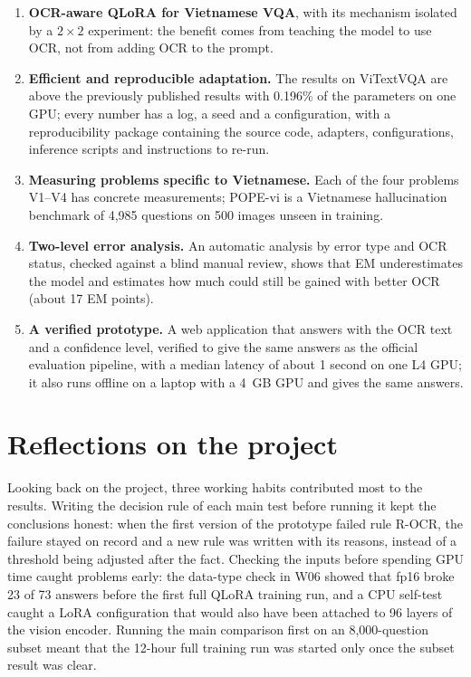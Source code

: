 \begin{enumerate}
  \item \textbf{OCR-aware QLoRA for Vietnamese VQA}, with its mechanism isolated by a
  $2\times2$ experiment: the benefit comes from teaching the model to use OCR, not from adding
  OCR to the prompt.
  \item \textbf{Efficient and reproducible adaptation.} The results on ViTextVQA are above the
  previously published results with 0.196\% of the parameters on one GPU; every number has a
  log, a seed and a configuration, with a reproducibility package containing the source code,
  adapters, configurations, inference scripts and instructions to re-run.
  \item \textbf{Measuring problems specific to Vietnamese.} Each of the four problems V1--V4
  has concrete measurements; POPE-vi is a Vietnamese hallucination benchmark of 4,985
  questions on 500 images unseen in training.
  \item \textbf{Two-level error analysis.} An automatic analysis by error type and OCR status,
  checked against a blind manual review, shows that EM underestimates the model and estimates
  how much could still be gained with better OCR (about 17 EM points).
  \item \textbf{A verified prototype.} A web application that answers with the OCR text and a
  confidence level, verified to give the same answers as the official evaluation pipeline,
  with a median latency of about 1 second on one L4 GPU; it also runs offline on a laptop
with a 4~GB GPU and gives the same answers.
\end{enumerate}

\section{Reflections on the project}
\label{sec:con-reflect}

Looking back on the project, three working habits contributed most to the results. Writing
the decision rule of each main test before running it kept the conclusions honest: when the
first version of the prototype failed rule R-OCR, the failure stayed on record and a new rule
was written with its reasons, instead of a threshold being adjusted after the fact. Checking
the inputs before spending GPU time caught problems early: the data-type check in W06 showed
that fp16 broke 23 of 73 answers before the first full QLoRA training run, and a CPU self-test
caught a LoRA configuration that would also have been attached to 96 layers of the vision
encoder. Running the main comparison first on an 8,000-question subset meant that the 12-hour
full training run was started only once the subset result was clear.

